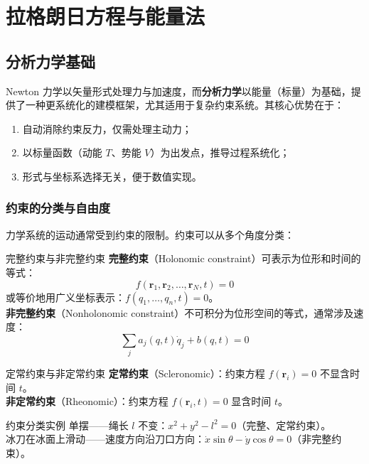 \chapter{拉格朗日方程与能量法}


\section{分析力学基础}

Newton 力学以矢量形式处理力与加速度，而\textbf{分析力学}以能量（标量）为基础，提供了一种更系统化的建模框架，尤其适用于复杂约束系统。其核心优势在于：
\begin{enumerate}
	\item 自动消除约束反力，仅需处理主动力；
	\item 以标量函数（动能 $T$、势能 $V$）为出发点，推导过程系统化；
	\item 形式与坐标系选择无关，便于数值实现。
\end{enumerate}

\subsection{约束的分类与自由度}

力学系统的运动通常受到约束的限制。约束可以从多个角度分类：

\begin{mydefinition}{完整约束与非完整约束}
	\textbf{完整约束}（Holonomic constraint）可表示为位形和时间的等式：
	\[
	f(\mathbf{r}_1, \mathbf{r}_2, \ldots, \mathbf{r}_N, t) = 0
	\]
	或等价地用广义坐标表示：$f(q_1, \ldots, q_n, t) = 0$。\\
	\textbf{非完整约束}（Nonholonomic constraint）不可积分为位形空间的等式，通常涉及速度：
	\[
	\sum_{j} a_{j}(q, t) \dot{q}_j + b(q, t) = 0
	\]
\end{mydefinition}

\begin{mydefinition}{定常约束与非定常约束}
	\textbf{定常约束}（Scleronomic）：约束方程 $f(\mathbf{r}_i) = 0$ 不显含时间 $t$。\\
	\textbf{非定常约束}（Rheonomic）：约束方程 $f(\mathbf{r}_i, t) = 0$ 显含时间 $t$。
\end{mydefinition}

\begin{example}{约束分类实例}
	单摆——绳长 $l$ 不变：$x^2 + y^2 - l^2 = 0$（完整、定常约束）。\\
	冰刀在冰面上滑动——速度方向沿刀口方向：$\dot{x} \sin\theta - \dot{y} \cos\theta = 0$（非完整约束）。
\end{example}

